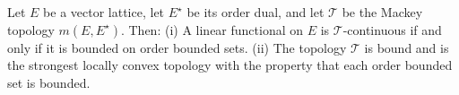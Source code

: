 Let $E$ be a vector lattice, let $E^{\star}$ be its order dual, and let $\mathcal{T}$ be the Mackey topology $m(E, E^{\star})$. Then:
(i) A linear functional on $E$ is $\mathcal{T}$-continuous if and only if it is bounded on order bounded sets.
(ii) The topology $\mathcal{T}$ is bound and is the strongest locally convex topology with the property that each order bounded set is bounded.
